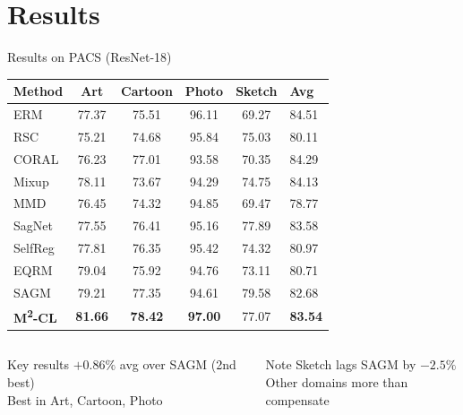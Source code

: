 \documentclass[aspectratio=169,10pt]{beamer}
\newcommand{\tablehl}{\rowcolor{LightBlue!60}}
\begin{document}
\section{Results}

\begin{frame}{Results on PACS (ResNet-18)}
  \centering
  \small
  \begin{tabular}{@{}lccccC{1.2cm}@{}}
    \toprule
    \textbf{Method} & \textbf{Art} & \textbf{Cartoon} & \textbf{Photo} & \textbf{Sketch} & \textbf{Avg} \\
    \midrule
    ERM       & 77.37 & 75.51 & 96.11 & 69.27 & 84.51 \\
    RSC       & 75.21 & 74.68 & 95.84 & 75.03 & 80.11 \\
    CORAL     & 76.23 & 77.01 & 93.58 & 70.35 & 84.29 \\
    Mixup     & 78.11 & 73.67 & 94.29 & 74.75 & 84.13 \\
    MMD       & 76.45 & 74.32 & 94.85 & 69.47 & 78.77 \\
    SagNet    & 77.55 & 76.41 & 95.16 & 77.89 & 83.58 \\
    SelfReg   & 77.81 & 76.35 & 95.42 & 74.32 & 80.97 \\
    EQRM      & 79.04 & 75.92 & 94.76 & 73.11 & 80.71 \\
    SAGM      & 79.21 & 77.35 & 94.61 & 79.58 & 82.68 \\
    \midrule
    \tablehl
    \textbf{M\textsuperscript{2}-CL} & \textbf{81.66} & \textbf{78.42} & \textbf{97.00} & 77.07 & \textbf{83.54} \\
    \bottomrule
  \end{tabular}

  \vspace{0.5em}
  \begin{columns}
      \begin{alertblock}{\small Key results}
        \small $+0.86\%$ avg over SAGM (2nd best)\\
        Best in Art, Cartoon, Photo
      \end{alertblock}
      \begin{exampleblock}{\small Note}
        \small Sketch lags SAGM by $-2.5\%$\\
        Other domains more than compensate
      \end{exampleblock}
  \end{columns}
\end{frame}
\end{document}
